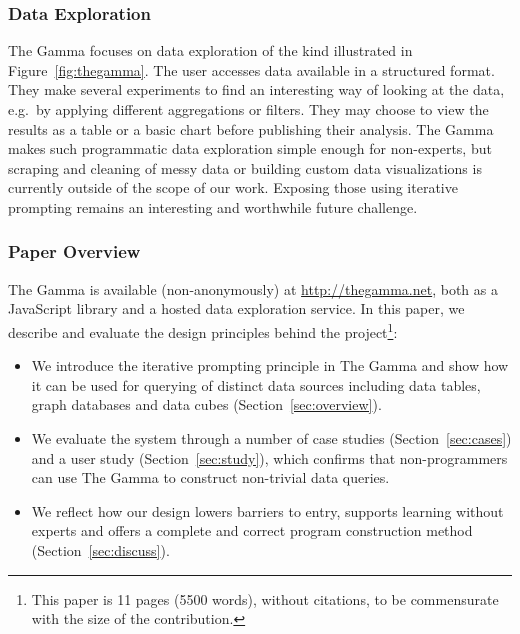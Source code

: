 \documentclass[manuscript,review,anonymous]{acmart}
\begin{document}
\subsubsection*{Data Exploration}
The Gamma focuses on data exploration of the kind illustrated in Figure~\ref{fig:thegamma}.
The user accesses data available in a structured format. They make several experiments to find an
interesting way of looking at the data, e.g.~by applying different aggregations or filters. They
may choose to view the results as a table or a basic chart before publishing their analysis. The
Gamma makes such programmatic data exploration simple enough for non-experts, but scraping and
cleaning of messy data or building custom data visualizations is currently outside of the scope of
our work. Exposing those using iterative prompting remains an interesting and worthwhile future
challenge.

\subsubsection*{Paper Overview}
The Gamma is available (non-anonymously) at \url{http://thegamma.net},
both as a JavaScript library and a hosted data exploration service. In this paper, we describe and
evaluate the design principles behind the project\footnote{This paper is 11 pages (5500 words),
without citations, to be commensurate with the size of the contribution.}:

\begin{itemize}
\item We introduce the iterative prompting principle in The Gamma
  and show how it can be used for querying of distinct data sources including data tables, graph
  databases and data cubes (Section~\ref{sec:overview}).

\item We evaluate the system through a number of case studies (Section~\ref{sec:cases})
  and a user study (Section~\ref{sec:study}), which confirms  that non-programmers can use The Gamma
  to construct non-trivial data queries.

\item We reflect how our design lowers barriers to entry, supports learning without experts and offers a
  complete and correct program construction method (Section~\ref{sec:discuss}).
\end{itemize}

\end{document}

